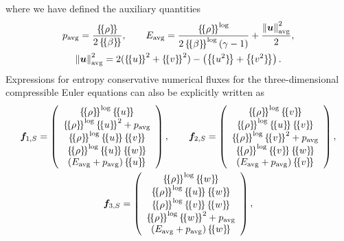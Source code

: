 \documentclass[onefignum,onetabnum,final]{siamart171218}
\newcommand{\nor}[1]{\left\| #1 \right\|}
\newcommand{\LRp}[1]{\left( #1 \right)}
\newcommand{\LRc}[1]{\left\{ #1 \right\}}
\newcommand{\avg}[1] {\ensuremath{\LRc{\!\{#1\}\!}}}
\begin{document}
where we have defined the auxiliary quantities 
\begin{gather}
p_{\rm avg} = \frac{\avg{\rho}}{2\avg{\beta}}, \qquad E_{\rm avg} = \frac{\avg{\rho}^{\log}}{2\avg{\beta}^{\log}\LRp{\gamma -1}}   + \frac{\nor{\bm{u}}^2_{\rm avg}}{2}, \label{eq:fluxaux} \\
 \nor{\bm{u}}^2_{\rm avg} = 2(\avg{u}^2 + \avg{v}^2) - \LRp{\avg{u^2} +\avg{v^2}} \nonumber.  
\end{gather}
Expressions for entropy conservative numerical fluxes for the three-dimensional compressible Euler equations can also be explicitly written as
\begin{gather*}
\bm{f}_{1,S} = \LRp{\begin{array}{c}
\avg{\rho}^{\log}\avg{u}\\
\avg{\rho}^{\log}\avg{u}^2 + p_{\rm avg}\\
\avg{\rho}^{\log}\avg{u}\avg{v}\\
\avg{\rho}^{\log}\avg{u}\avg{w}\\
(E_{\rm avg}+ p_{\rm avg})\avg{u}\\
\end{array}}, 
\qquad 
\bm{f}_{2,S} = \LRp{\begin{array}{c}
\avg{\rho}^{\log}\avg{v}\\
\avg{\rho}^{\log}\avg{u}\avg{v}\\
\avg{\rho}^{\log}\avg{v}^2 + p_{\rm avg}\\
\avg{\rho}^{\log}\avg{v}\avg{w}\\
(E_{\rm avg}+ p_{\rm avg})\avg{v}\\
\end{array}},\\
\bm{f}_{3,S} = \LRp{\begin{array}{c}
\avg{\rho}^{\log}\avg{w}\\
\avg{\rho}^{\log}\avg{u}\avg{w}\\
\avg{\rho}^{\log}\avg{v}\avg{w}\\
\avg{\rho}^{\log}\avg{w}^2 + p_{\rm avg}\\
(E_{\rm avg}+ p_{\rm avg})\avg{w}\\
\end{array}},\nonumber
\end{gather*}
\end{document}
